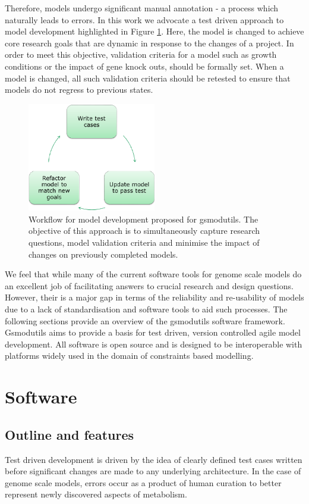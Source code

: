 \documentclass[a4paper,10pt]{article}
\begin{document}
Therefore, models undergo significant manual annotation - a process which naturally leads to errors.
In this work we advocate a test driven approach to model development highlighted in Figure \ref{fig:test_driven}.
Here, the model is changed to achieve core research goals that are dynamic in response to the changes of a project.
In order to meet this objective, validation criteria for a model such as growth conditions or the impact of gene knock outs, should be formally set.
When a model is changed, all such validation criteria should be retested to ensure that models do not regress to previous states.

\begin{figure}[ht]
\centering
\includegraphics[width=0.5\textwidth]{Testdriven.png}
\caption{Workflow for model development proposed for gsmodutils.
The objective of this approach is to simultaneously capture research questions, model validation criteria and minimise the impact of changes on previously completed models.
}
\label{fig:test_driven}
\end{figure}

We feel that while many of the current software tools for genome scale models do an excellent job of facilitating answers to crucial research and design questions.
However, their is a major gap in terms of the reliability and re-usability of models due to a lack of standardisation and software tools to aid such processes.
The following sections provide an overview of the gsmodutils software framework.
Gsmodutils aims to provide a basis for test driven, version controlled agile model development.
All software is open source and is designed to be interoperable with platforms widely used in the domain of constraints based modelling.

\section{Software}

\subsection{Outline and features}
Test driven development is driven by the idea of clearly defined test cases written before significant changes are made to any underlying architecture.
In the case of genome scale models, errors occur as a product of human curation to better represent newly discovered aspects of metabolism.
\end{document}
